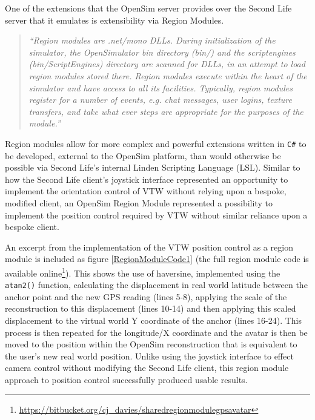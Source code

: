\newcommand{\RegionModuleCodeFootnote}{\footnote{\url{https://bitbucket.org/cj_davies/sharedregionmodulegpsavatar}}}


One of the extensions that the OpenSim server provides over the Second Life server that it emulates is extensibility via Region Modules.

\begin{quotation}
	\textit{``Region modules are .net/mono DLLs. During initialization of the simulator, the OpenSimulator bin directory (bin/) and the scriptengines (bin/ScriptEngines) directory are scanned for DLLs, in an attempt to load region modules stored there. Region modules execute within the heart of the simulator and have access to all its facilities. Typically, region modules register for a number of events, e.g. chat messages, user logins, texture transfers, and take what ever steps are appropriate for the purposes of the module.''}\RegionModuleFootnote{}
\end{quotation}

Region modules allow for more complex and powerful extensions written in \texttt{C\#} to be developed, external to the OpenSim platform, than would otherwise be possible via Second Life's internal Linden Scripting Language (LSL). Similar to how the Second Life client's joystick interface represented an opportunity to implement the orientation control of VTW without relying upon a bespoke, modified client, an OpenSim Region Module represented a possibility to implement the position control required by VTW without similar reliance upon a bespoke client.

An excerpt from the implementation of the VTW position control as a region module is included as figure \ref{RegionModuleCode1} (the full region module code is available online\RegionModuleCodeFootnote{}). This shows the use of haversine, implemented using the \texttt{atan2()} function, calculating the displacement in real world latitude between the anchor point and the new GPS reading (lines 5-8), applying the scale of the reconstruction to this displacement (lines 10-14) and then applying this scaled displacement to the virtual world Y coordinate of the anchor (lines 16-24). This process is then repeated for the longitude/X coordinate and the avatar is then be moved to the position within the OpenSim reconstruction that is equivalent to the user's new real world position. Unlike using the joystick interface to effect camera control without modifying the Second Life client, this region module approach to position control successfully produced usable results.

